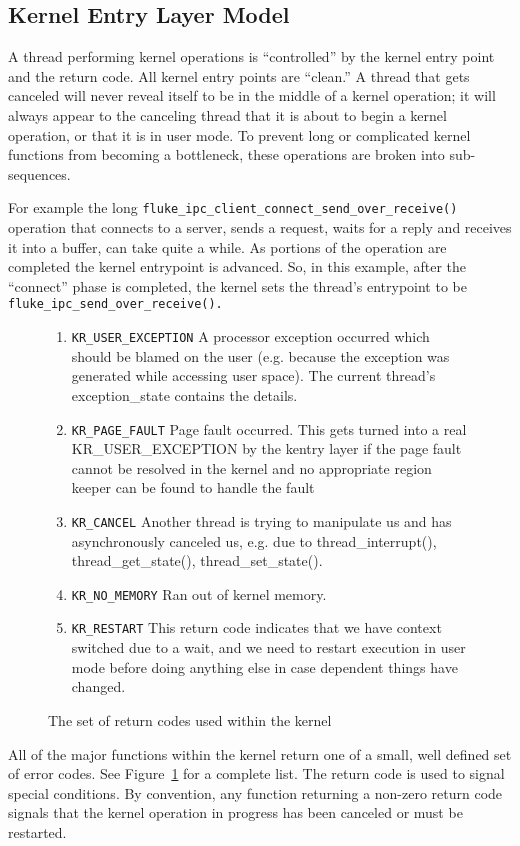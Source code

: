 \subsection{Kernel Entry Layer Model}

A thread performing kernel operations is ``controlled'' by the kernel
entry point and the return code. 
All kernel entry points are ``clean.''  A thread that gets canceled
will never reveal itself to be in the middle of a kernel operation;
it will always appear to the canceling thread that it is about to
begin a kernel operation, or that it is in user mode.  To prevent
long or complicated kernel functions from becoming a bottleneck, these
operations are broken into sub-sequences.  

For example the long 
{\tt fluke_ipc_client_connect_send_over_receive()} operation that
connects to a server, sends a request, waits for a reply and receives
it into a buffer, can take quite a while.  As portions of the
operation are completed the kernel entrypoint is advanced.  So, in 
this example, after the ``connect'' phase is completed, the kernel
sets the thread's entrypoint to be {\tt
fluke_ipc_send_over_receive().}

\begin{figure}
{\small
\begin{enumerate}
\item {\tt KR_USER_EXCEPTION} A processor exception occurred which
should be blamed on the user (e.g. because the exception was generated
while accessing user space). The current thread's exception_state
contains the details.

\item {\tt KR_PAGE_FAULT} Page fault occurred.
This gets turned into a real KR_USER_EXCEPTION by the kentry layer
if the page fault cannot be resolved in the kernel
and no appropriate region keeper can be found to handle the fault

\item {\tt KR_CANCEL} Another thread is trying to manipulate us and
has asynchronously canceled us,  e.g. due to thread_interrupt(),
thread_get_state(), thread_set_state().

\item {\tt KR_NO_MEMORY} Ran out of kernel memory.

\item {\tt KR_RESTART} This return code indicates that we have context
switched due to a wait, and we need to restart execution in user mode
before doing anything else in case dependent things have changed.

\end{enumerate}
}
\caption{The set of return codes used within the kernel}
\label{ReturnCodes-fig}
\end{figure}

All of the major functions within the kernel return one of a small,
well defined set of error codes.  See Figure~\ref{ReturnCodes-fig}
for a complete list.
The return code is used to signal special conditions. By convention,
any function returning a non-zero return code signals that the
kernel operation in progress has been canceled or must be restarted.

